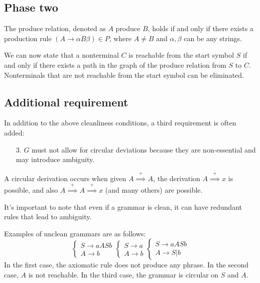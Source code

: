 \subsection*{Phase two}
The produce relation, denoted as $A$ produce $B$, holds if and only if there exists a production rule $(A \rightarrow \alpha B \beta) \in P$, where $A \neq B$ and $\alpha,\beta$ can be any strings.

We can now state that a nonterminal $C$ is reachable from the start symbol $S$ if and only if there exists a path in the graph of the produce relation from $S$ to $C$. 
Nonterminals that are not reachable from the start symbol can be eliminated.

\subsection*{Additional requirement}
In addition to the above cleanliness conditions, a third requirement is often added:
\begin{enumerate}
    \item [3.] $G$ must not allow for circular deviations because they are non-essential and may introduce ambiguity.
\end{enumerate} 
A circular derivation occurs when given $A \overset{+}{\implies} A$, the derivation $A \overset{+}{\implies} x$ is possible, and also $A \overset{+}{\implies} A \overset{+}{\implies} x$ (and many others) are possible.

It's important to note that even if a grammar is clean, it can have redundant rules that lead to ambiguity.
\begin{example}
    Examples of unclean grammars are as follows:
    \[
    \begin{cases}
        S \rightarrow aASb \\
        A \rightarrow b
    \end{cases} 
    \begin{cases}
        S \rightarrow a \\
        A \rightarrow b
    \end{cases} 
    \begin{cases}
        S \rightarrow aASb \\
        A \rightarrow S|b
    \end{cases} 
    \]
    In the first case, the axiomatic rule does not produce any phrase. 
    In the second case, $A$ is not reachable. 
    In the third case, the grammar is circular on $S$ and $A$.
\end{example}
\newpage